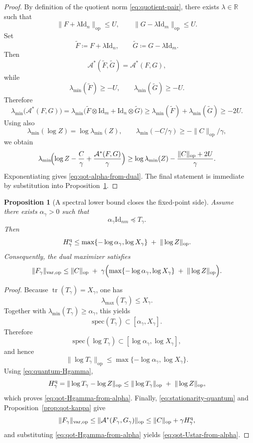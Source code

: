 \documentclass[11pt]{article}
\newcommand{\RR}{\mathbb{R}}
\newcommand{\Id}{\mathrm{Id}}
\newcommand{\tr}{\operatorname{tr}}
\newcommand{\eqdef}{\coloneqq}
\newcommand{\Aa}{\mathcal{A}}
\newcommand{\op}{\mathrm{op}}
\newcommand{\varop}{\mathrm{var},\op}
\theoremstyle{plain}
\newtheorem{proposition}{Proposition}[section]
\begin{document}
\begin{proof}
By definition of the quotient norm \eqref{eq:quotient-pair}, there exists $\lambda\in\RR$ such that
\[
\|F+\lambda \Id_n\|_{\op}\le U,
\qquad
\|G-\lambda \Id_m\|_{\op}\le U.
\]
Set
\[
\widetilde F\eqdef F+\lambda \Id_n,
\qquad
\widetilde G\eqdef G-\lambda \Id_m.
\]
Then
\[
\Aa^\ast(\widetilde F,\widetilde G)=\Aa^\ast(F,G),
\]
while
\[
\lambda_{\min}(\widetilde F)\ge -U,
\qquad
\lambda_{\min}(\widetilde G)\ge -U.
\]
Therefore
\[
\lambda_{\min}\!\bigl(\Aa^\ast(F,G)\bigr)
=
\lambda_{\min}\!\bigl(\widetilde F\otimes \Id_m+\Id_n\otimes \widetilde G\bigr)
\ge
\lambda_{\min}(\widetilde F)+\lambda_{\min}(\widetilde G)
\ge
-2U.
\]
Using also
\[
\lambda_{\min}(\log Z)=\log \lambda_{\min}(Z),
\qquad
\lambda_{\min}(-C/\gamma)\ge -\|C\|_{\op}/\gamma,
\]
we obtain
\[
\lambda_{\min}\!\Bigl(
\log Z-\frac{C}{\gamma}+\frac{\Aa^\ast(F,G)}{\gamma}
\Bigr)
\ge
\log \lambda_{\min}(Z)-\frac{\|C\|_{\op}+2U}{\gamma}.
\]
Exponentiating gives \eqref{eq:qot-alpha-from-dual}.
The final statement is immediate by substitution into Proposition~\ref{prop:qot-lower-spectral-bound}.
\end{proof}

\begin{proposition}[A spectral lower bound closes the fixed-point side]
\label{prop:qot-lower-spectral-bound}
Assume there exists $\alpha_\gamma>0$ such that
\[
\alpha_\gamma \Id_{nm}\preceq T_\gamma.
\]
Then
\begin{equation}
\label{eq:qot-Hgamma-from-alpha}
H_\gamma^{\rm q}
\le
\max\{-\log \alpha_\gamma,\log X_\gamma\}
\;+\;
\|\log Z\|_{\op}.
\end{equation}
Consequently, the dual maximizer satisfies
\begin{equation}
\label{eq:qot-Ustar-from-alpha}
\|F_\gamma\|_{\varop}
\le
\|C\|_{\op}
\;+\;
\gamma\Bigl(
\max\{-\log \alpha_\gamma,\log X_\gamma\}
\;+\;
\|\log Z\|_{\op}
\Bigr).
\end{equation}
\end{proposition}

\begin{proof}
Because $\tr(T_\gamma)=X_\gamma$, one has
\[
\lambda_{\max}(T_\gamma)\le X_\gamma.
\]
Together with $\lambda_{\min}(T_\gamma)\ge \alpha_\gamma$, this yields
\[
\mathrm{spec}(T_\gamma)\subset [\alpha_\gamma,X_\gamma].
\]
Therefore
\[
\mathrm{spec}(\log T_\gamma)\subset [\log \alpha_\gamma,\log X_\gamma],
\]
and hence
\[
\|\log T_\gamma\|_{\op}
\le
\max\{-\log \alpha_\gamma,\log X_\gamma\}.
\]
Using \eqref{eq:quantum-Hgamma},
\[
H_\gamma^{\rm q}
=
\|\log T_\gamma-\log Z\|_{\op}
\le
\|\log T_\gamma\|_{\op}
\;+\;
\|\log Z\|_{\op},
\]
which proves \eqref{eq:qot-Hgamma-from-alpha}.
Finally, \eqref{eq:stationarity-quantum} and Proposition~\ref{prop:qot-kappa} give
\[
\|F_\gamma\|_{\varop}
\le
\|\Aa^\ast(F_\gamma,G_\gamma)\|_{\op}
\le
\|C\|_{\op}+\gamma H_\gamma^{\rm q},
\]
and substituting \eqref{eq:qot-Hgamma-from-alpha} yields \eqref{eq:qot-Ustar-from-alpha}.
\end{proof}
\end{document}
